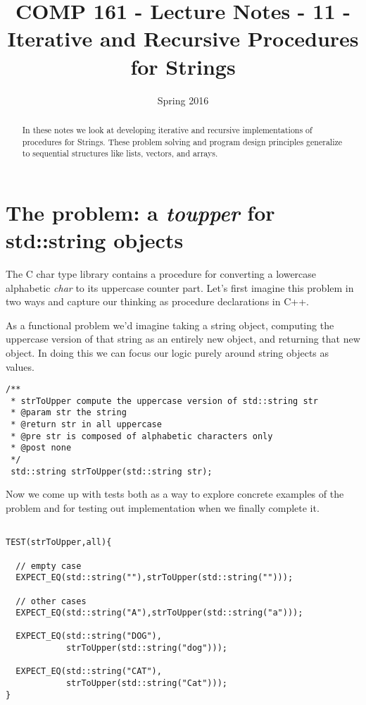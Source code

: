 \documentclass[]{tufte-handout}
\title{COMP 161 - Lecture Notes - 11 - Iterative and Recursive Procedures for Strings}
\date{Spring 2016}
\begin{document}
 
\maketitle

\begin{abstract}
In these notes we look at developing iterative and recursive implementations of procedures for Strings.  These problem solving and program design principles generalize to sequential structures like lists, vectors, and arrays.
\end{abstract}

\section{The problem: a \textit{toupper} for std::string objects}

The C char type library contains a procedure for converting a lowercase alphabetic \textit{char} to its uppercase counter part.  Let's first imagine this problem in two ways and capture our thinking as procedure declarations in C++. 

As a functional problem we'd imagine taking a string object, computing the uppercase version of that string as an entirely new object, and returning that new object.  In doing this we can focus our logic purely around string objects as values. 
  
\begin{verbatim}
/** 
 * strToUpper compute the uppercase version of std::string str
 * @param str the string
 * @return str in all uppercase
 * @pre str is composed of alphabetic characters only
 * @post none
 */
 std::string strToUpper(std::string str);
\end{verbatim}

Now we come up with tests both as a way to explore concrete examples of the problem and for testing out implementation when we finally complete it. 
\begin{verbatim}

TEST(strToUpper,all){

  // empty case
  EXPECT_EQ(std::string(""),strToUpper(std::string("")));

  // other cases
  EXPECT_EQ(std::string("A"),strToUpper(std::string("a")));

  EXPECT_EQ(std::string("DOG"),
            strToUpper(std::string("dog")));
          
  EXPECT_EQ(std::string("CAT"),
            strToUpper(std::string("Cat")));
}
\end{verbatim}
\end{document}
